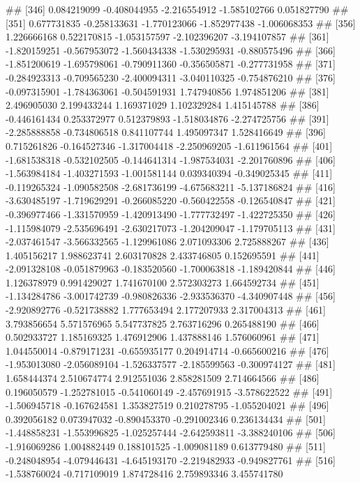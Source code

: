 \documentclass[
]{article}
\begin{document}
\begin{enumerate}[label=(\alph*)]
##  [346]  0.084219099 -0.408044955 -2.216554912 -1.585102766  0.051827790
##  [351]  0.677731835 -0.258133631 -1.770123066 -1.852977438 -1.006068353
##  [356]  1.226666168  0.522170815 -1.053157597 -2.102396207 -3.194107857
##  [361] -1.820159251 -0.567953072 -1.560434338 -1.530295931 -0.880575496
##  [366] -1.851200619 -1.695798061 -0.790911360 -0.356505871 -0.277731958
##  [371] -0.284923313 -0.709565230 -2.400094311 -3.040110325 -0.754876210
##  [376] -0.097315901 -1.784363061 -0.504591931  1.747940856  1.974851206
##  [381]  2.496905030  2.199433244  1.169371029  1.102329284  1.415145788
##  [386] -0.446161434  0.253372977  0.512379893 -1.518034876 -2.274725756
##  [391] -2.285888858 -0.734806518  0.841107744  1.495097347  1.528416649
##  [396]  0.715261826 -0.164527346 -1.317004418 -2.250969205 -1.611961564
##  [401] -1.681538318 -0.532102505 -0.144641314 -1.987534031 -2.201760896
##  [406] -1.563984184 -1.403271593 -1.001581144  0.039340394 -0.349025345
##  [411] -0.119265324 -1.090582508 -2.681736199 -4.675683211 -5.137186824
##  [416] -3.630485197 -1.719629291 -0.266085220 -0.560422558 -0.126540847
##  [421] -0.396977466 -1.331570959 -1.420913490 -1.777732497 -1.422725350
##  [426] -1.115984079 -2.535696491 -2.630217073 -1.204209047 -1.179705113
##  [431] -2.037461547 -3.566332565 -1.129961086  2.071093306  2.725888267
##  [436]  1.405156217  1.988623741  2.603170828  2.433746805  0.152695591
##  [441] -2.091328108 -0.051879963 -0.183520560 -1.700063818 -1.189420844
##  [446]  1.126378979  0.991429027  1.741670100  2.572303273  1.664592734
##  [451] -1.134284786 -3.001742739 -0.980826336 -2.933536370 -4.340907448
##  [456] -2.920892776 -0.521738882  1.777653494  2.177207933  2.317004313
##  [461]  3.793856654  5.571576965  5.547737825  2.763716296  0.265488190
##  [466]  0.502933727  1.185169325  1.476912906  1.437888146  1.576060961
##  [471]  1.044550014 -0.879171231 -0.655935177  0.204914714 -0.665600216
##  [476] -1.953013080 -2.056089104 -1.526337577 -2.185599563 -0.300974127
##  [481]  1.658444374  2.510674774  2.912551036  2.858281509  2.714664566
##  [486]  0.196050579 -1.252781015 -0.541060149 -2.457691915 -3.578622522
##  [491] -1.506945718 -0.167624581  1.353827519  0.210278795 -1.055204021
##  [496]  0.392056182  0.073947032 -0.890453370 -0.291002346  0.236134434
##  [501] -1.448858231 -1.553996825 -1.025257444 -2.642593811 -3.388240106
##  [506] -1.916069286  1.004882449  0.188101525 -1.009081189  0.613779480
##  [511] -0.248048954 -4.079446431 -4.645193170 -2.219482933 -0.949827761
##  [516] -1.538760024 -0.717109019  1.874728416  2.759893346  3.455741780

\end{enumerate}
\end{document}
